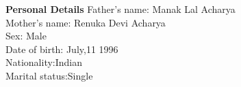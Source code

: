 \documentclass{article}
\begin{document}
	      
	      \begin{flushleft}
	      	\vspace{0.4in}
	      	\textbf{Personal Details} \hspace{0.36in}Father's name: \hspace{0.13in} Manak Lal Acharya \\
	      	\hspace{1.55in}Mother's name: \hspace{0.08in} Renuka Devi Acharya\\
	      	\hspace{1.55in}Sex:\hspace{0.85in} Male\\
	      	\hspace{1.55in}Date of birth:\hspace{0.255in} July,11 1996	\\
	      	\hspace{1.55in}Nationality:\hspace{0.45in}Indian\\
	      	\hspace{1.55in}Marital status:\hspace{0.28in}Single
	      	
	      \end{flushleft}
	      
	      
	
\end{document}
